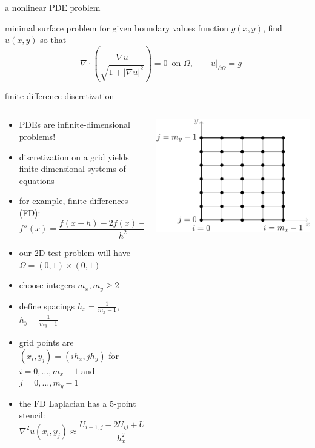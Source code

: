 \documentclass[10pt,
               svgnames,
               hyperref={colorlinks,citecolor=DeepPink4,linkcolor=FireBrick,urlcolor=Maroon},
               usepdftitle=false]{beamer}
\newcommand{\grad}{\nabla}
\newcommand{\Div}{\nabla \cdot}
\begin{document}
\begin{frame}{a nonlinear PDE problem}
\bigskip
\begin{block}{minimal surface problem} for given boundary values function $g(x,y)$, find $u(x,y)$ so that
    $$-\Div \left(\frac{\grad u}{\sqrt{1 + |\grad u|^2}}\right) = 0 \, \text{ on } \Omega, \qquad u\big|_{\partial \Omega} = g$$
\end{block}
\end{frame}


\begin{frame}{finite difference discretization}
\begin{columns}
\begin{column}{0.7\textwidth}
\begin{itemize}
\item PDEs are infinite-dimensional problems!
\item discretization on a grid yields finite-dimensional systems of equations
\item for example, finite differences (FD):
    $$f''(x) = \frac{f(x+h) - 2 f(x) + f(x-h)}{h^2} + O(h^2)$$
\item our 2D test problem will have $\Omega = (0,1) \times (0,1)$
\item choose integers $m_x,m_y \ge 2$
\item define spacings $h_x=\frac{1}{m_x-1}$, $h_y=\frac{1}{m_y-1}$
\item grid points are $(x_i,y_j) = (ih_x,jh_y)$ for $i=0,\dots,m_x-1$ and $j=0,\dots,m_y-1$
\item the FD Laplacian has a 5-point stencil:
{\small
$$\grad^2 u(x_i,y_j) \approx \frac{U_{i-1,j} - 2 U_{ij} + U_{i+1,j}}{h_x^2} + \frac{U_{i,j-1} - 2 U_{ij} + U_{i,j+1}}{h_y^2}$$
}
\end{itemize}
\end{column}
\begin{column}{0.3\textwidth}
\hfill \includegraphics[width=\textwidth]{images/gridindexing.png}


\end{column}
\end{columns}
\end{frame}
\end{document}
